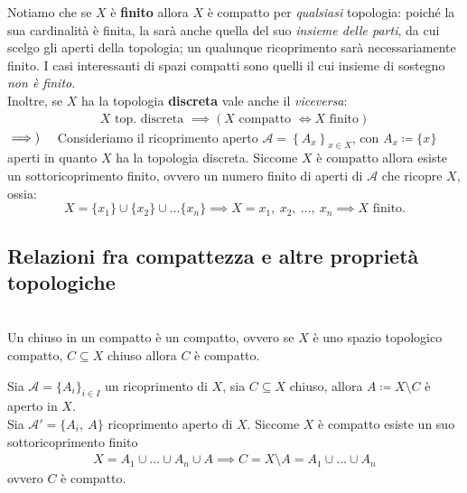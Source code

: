 \begin{observe}
Notiamo che se $X$ è \textbf{finito} allora $X$ è compatto per \textit{qualsiasi} topologia: poiché la sua cardinalità è finita, la sarà anche quella del suo \textit{insieme delle parti}, da cui scelgo gli aperti della topologia; un qualunque ricoprimento sarà necessariamente finito. I casi interessanti di spazi compatti sono quelli il cui insieme di sostegno \textit{non è finito}.\\
Inoltre, se $X$ ha la topologia \textbf{discreta} vale anche il \textit{viceversa}:
	\begin{gather*}
		X \text{ top. discreta } \implies \left( X \text{ compatto } \iff X \text{ finito}\right)
	\end{gather*}
$\implies)\quad$ Consideriamo il ricoprimento aperto $\mathcal{A}=\left\{ A_x\right\}_{x\in X}$, con $A_x\coloneqq \{x\}$ aperti in quanto $X$ ha la topologia discreta. Siccome $X$ è compatto allora esiste un sottoricoprimento finito, ovvero un numero finito di aperti di $\mathcal{A}$ che ricopre $X$, ossia:
\begin{equation*}
	X=\{x_1\}\cup\{x_2\}\cup\ldots\{x_n\}\implies X={x_1,\ x_2,\ \ldots,\ x_n}\implies X \text{ finito.}
\end{equation*}
\vspace{-6mm}
\end{observe}
\subsection{Relazioni fra compattezza e altre proprietà topologiche}
\begin{theorema}~{}\label{chiuso in compatto}\\
Un chiuso in un compatto è un compatto, ovvero se $X$ è uno spazio topologico compatto, $C\subseteq X$ chiuso allora $C$ è compatto.
\end{theorema}
\begin{demonstration}
	Sia $\mathcal{A}=\{A_i \}_{i\in I}$ un ricoprimento di $X$, sia $C\subseteq X$ chiuso, allora $A\coloneqq X\setminus C$ è aperto in $X$.\\
	Sia $\mathcal{A}'=\{A_i,\ A\}$ ricoprimento aperto di $X$. Siccome $X$ è compatto esiste un suo sottoricoprimento finito
		\begin{gather*}
			X=A_1\cup\ldots\cup A_n\cup A \implies C=X\setminus A=A_1\cup\ldots\cup A_n
		\end{gather*}
	ovvero $C$ è compatto.
\end{demonstration}

